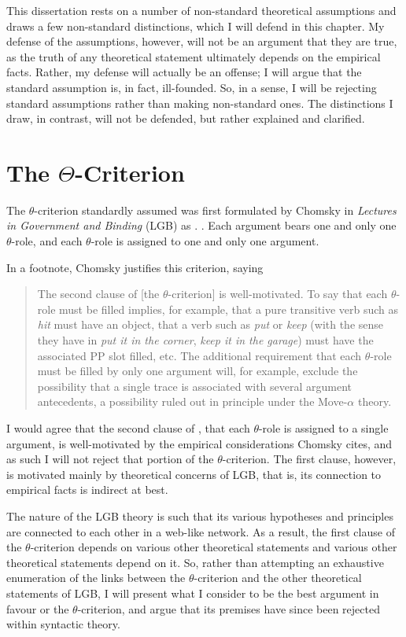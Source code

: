 \documentclass[MilwayThesis]{subfiles}
\begin{document}
This dissertation rests on a number of non-standard theoretical assumptions and draws a few non-standard distinctions, which I will defend in this chapter.
My defense of the assumptions, however, will not be an argument that they are true, as the truth of any theoretical statement ultimately depends on the empirical facts.
Rather, my defense will actually be an offense; I will argue that the standard assumption is, in fact, ill-founded.
So, in a sense, I will be rejecting standard assumptions rather than making non-standard ones.
The distinctions I draw, in contrast, will not be defended, but rather explained and clarified.

\section{The $\Theta$-Criterion}
The $\theta$-criterion standardly assumed was first formulated by Chomsky in \textit{Lectures in Government and Binding} (LGB) as \Next.
\ex. Each argument bears one and only one $\theta$-role, and each $\theta$-role is assigned to one and only one argument. \parencite[36]{chomsky1981lectures}

In a footnote, Chomsky justifies this criterion, saying 
\begin{quote}
	The second clause of [the $\theta$-criterion] is well-motivated.
	To say that each $\theta$-role must be filled implies, for example, that a pure transitive verb such as \textit{hit} must have an object, that a verb such as \textit{put} or \textit{keep} (with the sense they have in \textit{put it in the corner}, \textit{keep it in the garage}) must have the associated PP slot filled, etc. 
	The additional requirement that each $\theta$-role must be filled by only one argument will, for example, exclude the possibility that a single trace is associated with several argument antecedents, a possibility ruled out in principle under the Move-$\alpha$ theory. 
	\parencite[139]{chomsky1981lectures}
\end{quote}
I would agree that the second clause of \Last, that each $\theta$-role is assigned to a single argument, is well-motivated by the empirical considerations Chomsky cites, and as such I will not reject that portion of the $\theta$-criterion.
The first clause, however, is motivated mainly by theoretical concerns of LGB, that is, its connection to empirical facts is indirect at best.

The nature of the LGB theory is such that its various hypotheses and principles are connected to each other in a web-like network.
As a result, the first clause of the $\theta$-criterion depends on various other theoretical statements and various other theoretical statements depend on it.
So, rather than attempting an exhaustive enumeration of the links between the $\theta$-criterion and the other theoretical statements of LGB, I will present what I consider to be the best argument in favour or the $\theta$-criterion, and argue that its premises have since been rejected within syntactic theory.
\end{document}
